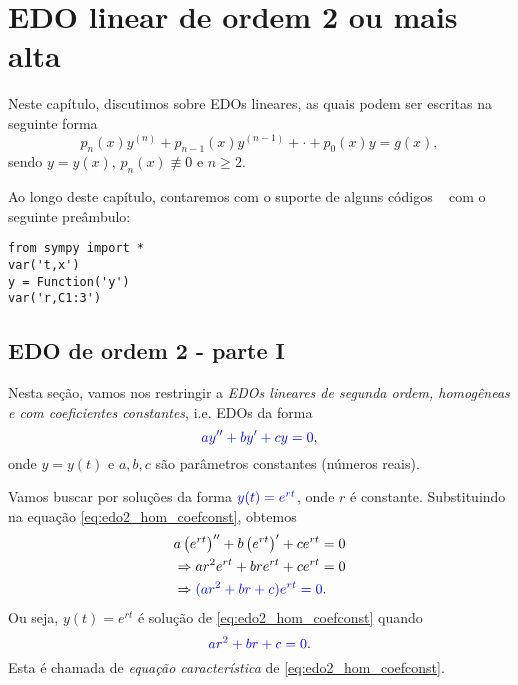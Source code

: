 
\chapter{EDO linear de ordem 2 ou mais alta}\label{cap_edolin}
\thispagestyle{fancy}

Neste capítulo, discutimos sobre EDOs lineares, as quais podem ser escritas na seguinte forma
\begin{equation}
  p_n(x)y^{(n)} + p_{n-1}(x)y^{(n-1)} + \cdot + p_0(x)y = g(x),
\end{equation}
sendo $y = y(x)$, $p_n(x)\not\equiv 0$ e $n\geq 2$.

\ifispython
\begin{obs}\label{obs:cap_edolin_python}
Ao longo deste capítulo, contaremos com o suporte de alguns códigos \python~ com o seguinte preâmbulo:
\begin{verbatim}
from sympy import *
var('t,x')
y = Function('y')
var('r,C1:3')
\end{verbatim}
\end{obs}
\fi


\section{EDO de ordem 2 - parte I}\label{cap_edolin_sec_edo2I}

Nesta seção, vamos nos restringir a \emph{EDOs lineares de segunda ordem, homogêneas e com coeficientes constantes}, i.e. EDOs da forma
\begin{equation}\label{eq:edo2_hom_coefconst}
  {\color{blue}ay'' + by' + cy = 0},
\end{equation}
onde $y = y(t)$ e $a, b, c$ são parâmetros constantes (números reais).

Vamos buscar por soluções da forma ${\color{blue}y(t) = e^{rt}}$, onde $r$ é constante. Substituindo na equação \eqref{eq:edo2_hom_coefconst}, obtemos
\begin{align}
  & a\left(e^{rt}\right)'' + b\left(e^{rt}\right)' + ce^{rt} = 0 \\
  & \Rightarrow ar^2e^{rt} + bre^{rt} + ce^{rt} = 0 \\
  & \Rightarrow {\color{blue}(ar^2 + br + c)e^{rt} = 0}.
\end{align}
Ou seja, $y(t) = e^{rt}$ é solução de \eqref{eq:edo2_hom_coefconst} quando
\begin{equation}
  {\color{blue}ar^2 + br + c = 0}.
\end{equation}
Esta é chamada de \emph{equação característica} de \eqref{eq:edo2_hom_coefconst}.

